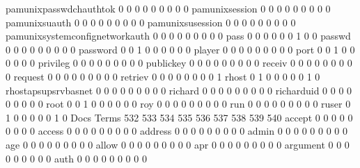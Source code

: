 \documentclass[compress,8pt]{beamer}
\begin{document}
\begin{frame}
\begin{Schunk}
  pamunixpasswdchauthtok                     0   0   0   0   0   0   0   0   0
  pamunixsession                             0   0   0   0   0   0   0   0   0
  pamunixsuauth                              0   0   0   0   0   0   0   0   0
  pamunixsusession                           0   0   0   0   0   0   0   0   0
  pamunixsystemconfignetworkauth             0   0   0   0   0   0   0   0   0
  pass                                       0   0   0   0   0   0   1   0   0
  passwd                                     0   0   0   0   0   0   0   0   0
  password                                   0   0   1   0   0   0   0   0   0
  player                                     0   0   0   0   0   0   0   0   0
  port                                       0   0   1   0   0   0   0   0   0
  privileg                                   0   0   0   0   0   0   0   0   0
  publickey                                  0   0   0   0   0   0   0   0   0
  receiv                                     0   0   0   0   0   0   0   0   0
  request                                    0   0   0   0   0   0   0   0   0
  retriev                                    0   0   0   0   0   0   0   0   1
  rhost                                      0   1   0   0   0   0   0   1   0
  rhostapsupsrvbasnet                        0   0   0   0   0   0   0   0   0
  richard                                    0   0   0   0   0   0   0   0   0
  richarduid                                 0   0   0   0   0   0   0   0   0
  root                                       0   0   1   0   0   0   0   0   0
  roy                                        0   0   0   0   0   0   0   0   0
  run                                        0   0   0   0   0   0   0   0   0
  ruser                                      0   1   0   0   0   0   0   1   0
                                          Docs
Terms                                      532 533 534 535 536 537 538 539 540
  accept                                     0   0   0   0   0   0   0   0   0
  access                                     0   0   0   0   0   0   0   0   0
  address                                    0   0   0   0   0   0   0   0   0
  admin                                      0   0   0   0   0   0   0   0   0
  age                                        0   0   0   0   0   0   0   0   0
  allow                                      0   0   0   0   0   0   0   0   0
  apr                                        0   0   0   0   0   0   0   0   0
  argument                                   0   0   0   0   0   0   0   0   0
  auth                                       0   0   0   0   0   0   0   0   0

\end{Schunk}
\end{frame}
\end{document}
